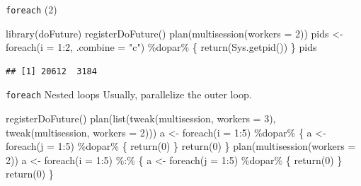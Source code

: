 \documentclass[
  ignorenonframetext,
  usenames,
  dvipsnames]{beamer}
\newenvironment{Shaded}{\begin{snugshade}}{\end{snugshade}}
\newcommand{\AttributeTok}[1]{\textcolor[rgb]{0.77,0.63,0.00}{#1}}
\newcommand{\DecValTok}[1]{\textcolor[rgb]{0.00,0.00,0.81}{#1}}
\newcommand{\FunctionTok}[1]{\textcolor[rgb]{0.00,0.00,0.00}{#1}}
\newcommand{\NormalTok}[1]{#1}
\newcommand{\OtherTok}[1]{\textcolor[rgb]{0.56,0.35,0.01}{#1}}
\newcommand{\SpecialCharTok}[1]{\textcolor[rgb]{0.00,0.00,0.00}{#1}}
\newcommand{\StringTok}[1]{\textcolor[rgb]{0.31,0.60,0.02}{#1}}
\begin{document}
\begin{frame}[fragile]{\texttt{foreach} (2)}
\protect\hypertarget{foreach-2}{}
\begin{Shaded}
\begin{Highlighting}[]
\FunctionTok{library}\NormalTok{(doFuture)}
\FunctionTok{registerDoFuture}\NormalTok{()}
\FunctionTok{plan}\NormalTok{(}\FunctionTok{multisession}\NormalTok{(}\AttributeTok{workers =} \DecValTok{2}\NormalTok{))}
\NormalTok{pids }\OtherTok{\textless{}{-}} \FunctionTok{foreach}\NormalTok{(}\AttributeTok{i =} \DecValTok{1}\SpecialCharTok{:}\DecValTok{2}\NormalTok{, }\AttributeTok{.combine =} \StringTok{"c"}\NormalTok{) }\SpecialCharTok{\%dopar\%}\NormalTok{ \{}
  \FunctionTok{return}\NormalTok{(}\FunctionTok{Sys.getpid}\NormalTok{())}
\NormalTok{\}}
\NormalTok{pids}
\end{Highlighting}
\end{Shaded}

\begin{verbatim}
## [1] 20612  3184
\end{verbatim}
\end{frame}

\begin{frame}[fragile]{\texttt{foreach} Nested loops}
\protect\hypertarget{foreach-nested-loops}{}
Usually, parallelize the outer loop. \small

\begin{Shaded}
\begin{Highlighting}[]
\FunctionTok{registerDoFuture}\NormalTok{()}
\FunctionTok{plan}\NormalTok{(}\FunctionTok{list}\NormalTok{(}\FunctionTok{tweak}\NormalTok{(multisession, }\AttributeTok{workers =} \DecValTok{3}\NormalTok{),}
          \FunctionTok{tweak}\NormalTok{(multisession, }\AttributeTok{workers =} \DecValTok{2}\NormalTok{)))}
\NormalTok{a }\OtherTok{\textless{}{-}} \FunctionTok{foreach}\NormalTok{(}\AttributeTok{i =} \DecValTok{1}\SpecialCharTok{:}\DecValTok{5}\NormalTok{) }\SpecialCharTok{\%dopar\%}\NormalTok{ \{}
\NormalTok{  a }\OtherTok{\textless{}{-}} \FunctionTok{foreach}\NormalTok{(}\AttributeTok{j =} \DecValTok{1}\SpecialCharTok{:}\DecValTok{5}\NormalTok{) }\SpecialCharTok{\%dopar\%}\NormalTok{ \{}
    \FunctionTok{return}\NormalTok{(}\DecValTok{0}\NormalTok{)}
\NormalTok{  \}}
  \FunctionTok{return}\NormalTok{(}\DecValTok{0}\NormalTok{)}
\NormalTok{\}}
\FunctionTok{plan}\NormalTok{(}\FunctionTok{multisession}\NormalTok{(}\AttributeTok{workers =} \DecValTok{2}\NormalTok{))}
\NormalTok{a }\OtherTok{\textless{}{-}} \FunctionTok{foreach}\NormalTok{(}\AttributeTok{i =} \DecValTok{1}\SpecialCharTok{:}\DecValTok{5}\NormalTok{) }\SpecialCharTok{\%:\%}\NormalTok{ \{}
\NormalTok{  a }\OtherTok{\textless{}{-}} \FunctionTok{foreach}\NormalTok{(}\AttributeTok{j =} \DecValTok{1}\SpecialCharTok{:}\DecValTok{5}\NormalTok{) }\SpecialCharTok{\%dopar\%}\NormalTok{ \{}
    \FunctionTok{return}\NormalTok{(}\DecValTok{0}\NormalTok{)}
\NormalTok{  \}}
  \FunctionTok{return}\NormalTok{(}\DecValTok{0}\NormalTok{)}
\NormalTok{\}}
\end{Highlighting}
\end{Shaded}

\normalsize
\end{frame}
\end{document}
